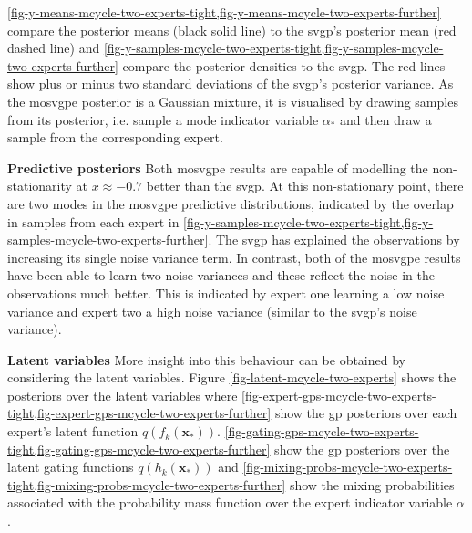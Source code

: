 \documentclass{mimosis-class/mimosis}
\numberwithin{equation}{chapter}
\newcommand{\modeInd}{\ensuremath{k}}
\newcommand{\mode}[1]{\ensuremath{#1_{\modeInd}}}
\newcommand{\x}{\ensuremath{\mathbf{x}}}
\newcommand{\modeVar}{\ensuremath{\alpha}}
\newcommand{\gatingFunc}{\ensuremath{h}}
\newcommand{\latentFunc}{\ensuremath{f}}
\begin{document}
{\cref{fig-y-means-mcycle-two-experts-tight,fig-y-means-mcycle-two-experts-further}
compare the posterior means (black solid line) to the \acrshort{svgp}'s posterior mean (red dashed line) and
\cref{fig-y-samples-mcycle-two-experts-tight,fig-y-samples-mcycle-two-experts-further}
compare the posterior densities to the \acrshort{svgp}.
The red lines show plus or minus two standard deviations of the \acrshort{svgp}'s posterior variance.
As the \acrshort{mosvgpe} posterior is a Gaussian mixture, it is visualised by drawing samples
from its posterior, i.e. sample a mode indicator variable \(\modeVar_*\) and then draw a sample
from the corresponding expert.

\textbf{Predictive posteriors} Both \acrshort{mosvgpe} results are capable of modelling the non-stationarity
at \(x \approx -0.7\) better than the \acrshort{svgp}.
At this non-stationary point, there are two modes in the \acrshort{mosvgpe} predictive distributions,
indicated by the overlap in samples from each expert
in \cref{fig-y-samples-mcycle-two-experts-tight,fig-y-samples-mcycle-two-experts-further}.
The \acrshort{svgp} has explained the observations by increasing its single
noise variance term. In contrast, both of the \acrshort{mosvgpe} results have been able to learn
two noise variances and these reflect the noise in the observations much better.
This is indicated by expert one learning a low noise variance and expert two a high noise
variance (similar to the \acrshort{svgp}'s noise variance).

\textbf{Latent variables} More insight into this behaviour can be obtained by considering the latent variables.
Figure \ref{fig-latent-mcycle-two-experts} shows the posteriors over the latent variables where
\cref{fig-expert-gps-mcycle-two-experts-tight,fig-expert-gps-mcycle-two-experts-further}
show the \acrshort{gp} posteriors over each expert's latent function \(q(\mode{\latentFunc}(\x_*))\).
\cref{fig-gating-gps-mcycle-two-experts-tight,fig-gating-gps-mcycle-two-experts-further}
show the \acrshort{gp} posteriors over the latent gating functions \(q(\mode{\gatingFunc}(\x_*))\)
and \cref{fig-mixing-probs-mcycle-two-experts-tight,fig-mixing-probs-mcycle-two-experts-further}
show the mixing probabilities associated with the probability mass function over the expert
indicator variable \(\modeVar\).

}
\end{document}
